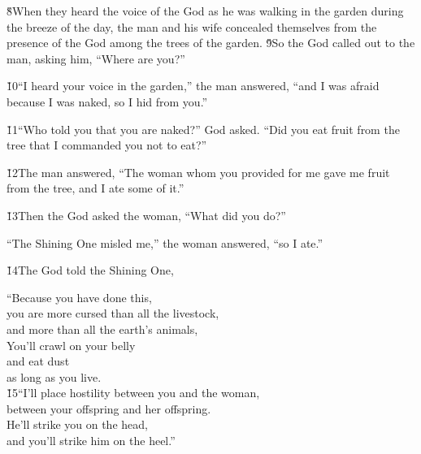 \v{8}When they heard the voice of the  God as he was walking in the garden during the breeze of the day, the man and his wife concealed themselves from the presence of the  God among the trees of the garden. \v{9}So the  God called out to the man, asking him, ``Where are you?''

\v{10}``I heard your voice in the garden,'' the man answered, ``and I was afraid because I was naked, so I hid from you.''

\v{11}``Who told you that you are naked?'' God asked. ``Did you eat fruit from the tree that I commanded you not to eat?''

\v{12}The man answered, ``The woman whom you provided for me gave me fruit from the tree, and I ate some of it.''

\v{13}Then the  God asked the woman, ``What did you do?''

``The Shining One misled me,'' the woman answered, ``so I ate.''

\v{14}The  God told the Shining One,

\begin{poetry}
\poeml ``Because you have done this, \\
\poemll    you are more cursed than all the livestock, \\
\poemlll       and more than all the earth's animals, \\
\poeml You'll crawl on your belly \\
\poemll    and eat dust \\
\poemlll       as long as you live. \\
\poeml \v{15}``I'll place hostility between you and the woman, \\
\poemll    between your offspring and her offspring. \\
\poeml He'll strike you on the head, \\
\poemll    and you'll strike him on the heel.''
\end{poetry}

